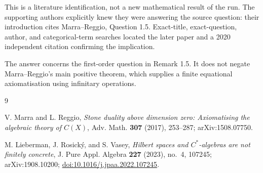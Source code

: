\documentclass[11pt]{article}
\begin{document}
This is a literature identification, not a new mathematical result of the
run.  The supporting authors explicitly knew they were answering the source
question: their introduction cites Marra--Reggio, Question 1.5.  Exact-title,
exact-question, author, and categorical-term searches located the later paper
and a 2020 independent citation confirming the implication.

The answer concerns the first-order question in Remark 1.5.  It does not
negate Marra--Reggio's main positive theorem, which supplies a finite
equational axiomatisation using infinitary operations.

\begin{thebibliography}{9}
\raggedright
{}
V. Marra and L. Reggio,
\emph{Stone duality above dimension zero: Axiomatising the algebraic theory of
$C(X)$}, Adv. Math. \textbf{307} (2017), 253--287;
arXiv:1508.07750.

M. Lieberman, J. Rosick\'y, and S. Vasey,
\emph{Hilbert spaces and $C^*$-algebras are not finitely concrete},
J. Pure Appl. Algebra \textbf{227} (2023), no.~4, 107245;
arXiv:1908.10200;
\href{https://doi.org/10.1016/j.jpaa.2022.107245}{doi:10.1016/j.jpaa.2022.107245}.
\end{thebibliography}
\end{document}
